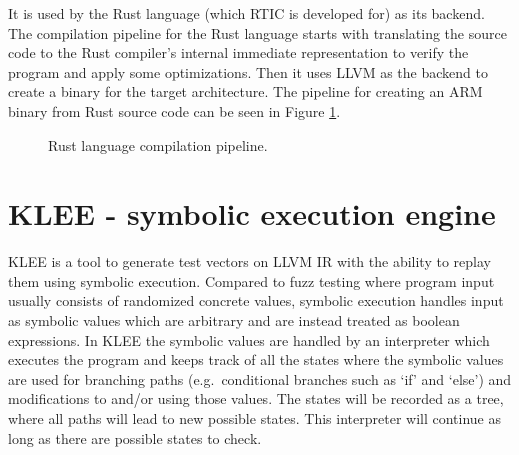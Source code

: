 It is used by the Rust language (which RTIC is developed for) as its backend.
The compilation pipeline for the Rust language starts with translating the
source code to the Rust compiler's internal immediate representation to
verify the program and apply some optimizations. Then it uses LLVM as the backend
to create a binary for the target architecture. The pipeline for creating an
ARM binary from Rust source code can be seen in Figure
\ref{figure:rustcompilation}.
\begin{figure}[h]
    \centering
    \caption{Rust language compilation pipeline.}
    \label{figure:rustcompilation}
\end{figure}


\section{KLEE - symbolic execution engine}
KLEE\cite{kleepaper} is a tool to generate test vectors on LLVM IR with the
ability to replay them using symbolic execution. Compared to fuzz testing
where program input usually consists of randomized concrete values, symbolic
execution handles input as symbolic values which are arbitrary and are instead
treated as boolean expressions. In KLEE the symbolic values are handled by an
interpreter which executes the program and keeps track of all the states where
the symbolic values are used for branching paths (e.g.\ conditional branches
such as `if' and `else') and modifications to and/or using those values. The
states will be recorded as a tree, where all paths will lead to new possible
states.  This interpreter will continue as long as there are possible states to
check.

